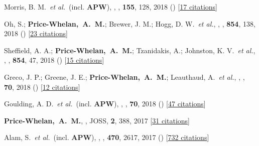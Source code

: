 \item[{\color{deemph}\scriptsize37}]Morris, B. M.~\textit{et al.}~(incl. \textbf{APW}), , \aj, \textbf{155}, 128, 2018 () [\href{http://adsabs.harvard.edu/abs/2018AJ....155..128M}{17 citations}]

\item[{\color{deemph}\scriptsize36}]Oh, S.; \textbf{Price-Whelan,~A.~M.}; Brewer, J. M.; Hogg, D. W.~\textit{et al.}, , \apj, \textbf{854}, 138, 2018 () [\href{http://adsabs.harvard.edu/abs/2018ApJ...854..138O}{23 citations}]

\item[{\color{deemph}\scriptsize35}]Sheffield, A. A.; \textbf{Price-Whelan,~A.~M.}; Tzanidakis, A.; Johnston, K. V.~\textit{et al.}, , \apj, \textbf{854}, 47, 2018 () [\href{http://adsabs.harvard.edu/abs/2018ApJ...854...47S}{15 citations}]

\item[{\color{deemph}\scriptsize34}]Greco, J. P.; Greene, J. E.; \textbf{Price-Whelan,~A.~M.}; Leauthaud, A.~\textit{et al.}, , \pasj, \textbf{70}, 2018 () [\href{http://adsabs.harvard.edu/abs/2018PASJ...70S..19G}{12 citations}]

\item[{\color{deemph}\scriptsize33}]Goulding, A. D.~\textit{et al.}~(incl. \textbf{APW}), , \pasj, \textbf{70}, 2018 () [\href{http://adsabs.harvard.edu/abs/2018PASJ...70S..37G}{47 citations}]

\item[{\color{deemph}\scriptsize32}]\textbf{Price-Whelan,~A.~M.}, , JOSS, \textbf{2}, 388, 2017 [\href{http://adsabs.harvard.edu/abs/2017JOSS....2..388P}{31 citations}]

\item[{\color{deemph}\scriptsize31}]Alam, S.~\textit{et al.}~(incl. \textbf{APW}), , \mnras, \textbf{470}, 2617, 2017 () [\href{http://adsabs.harvard.edu/abs/2017MNRAS.470.2617A}{732 citations}]


